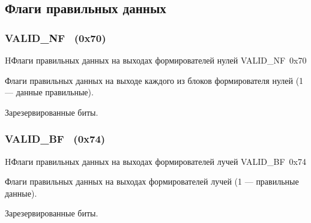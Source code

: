 \subsection{Флаги правильных данных}

\subsubsection{VALID\_NF~ (0x70)}
\renewcommand{\regnam}{VALID\_NF~}
\label{sec:VALID_NF}

\begin{register}{H}{Флаги правильных данных на выходах формирователей нулей \regnam}{0x70}

\label{regsamplecount}%
%
%
\regnewline%

\begin{regdesc}\begin{reglist}
\item [VALID\_NF (rw)]
Флаги правильных данных на выходе каждого из блоков формирователя нулей (1 --- данные правильные).
\item [Reserved]
Зарезервированные биты.
\end{reglist}\end{regdesc}
\end{register}

\subsubsection{VALID\_BF~ (0x74)}
\renewcommand{\regnam}{VALID\_BF~}
\label{sec:VALID_BF}

\begin{register}{H}{Флаги правильных данных на выходах формирователей лучей \regnam}{0x74}

\label{regsamplecount}%
%
%
\regnewline%

\begin{regdesc}\begin{reglist}
\item [VALID\_BF (rw)]
Флаги правильных данных на выходах формирователей лучей (1 --- правильные данные).
\item [Reserved]
Зарезервированные биты.
\end{reglist}\end{regdesc}
\end{register}

